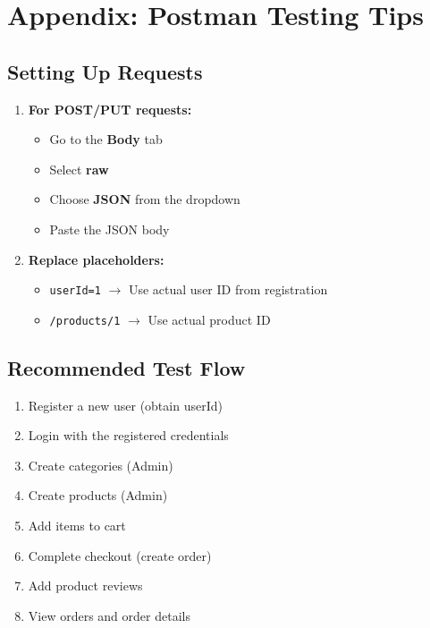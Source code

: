 \documentclass[12pt, a4paper]{article}
\begin{document}
\section{Appendix: Postman Testing Tips}

\subsection{Setting Up Requests}

\begin{enumerate}
    \item \textbf{For POST/PUT requests:}
    \begin{itemize}
        \item Go to the \textbf{Body} tab
        \item Select \textbf{raw}
        \item Choose \textbf{JSON} from the dropdown
        \item Paste the JSON body
    \end{itemize}
    
    \item \textbf{Replace placeholders:}
    \begin{itemize}
        \item \texttt{userId=1} $\rightarrow$ Use actual user ID from registration
        \item \texttt{/products/1} $\rightarrow$ Use actual product ID
    \end{itemize}
\end{enumerate}

\subsection{Recommended Test Flow}

\begin{enumerate}
    \item Register a new user (obtain userId)
    \item Login with the registered credentials
    \item Create categories (Admin)
    \item Create products (Admin)
    \item Add items to cart
    \item Complete checkout (create order)
    \item Add product reviews
    \item View orders and order details
\end{enumerate}
\end{document}
